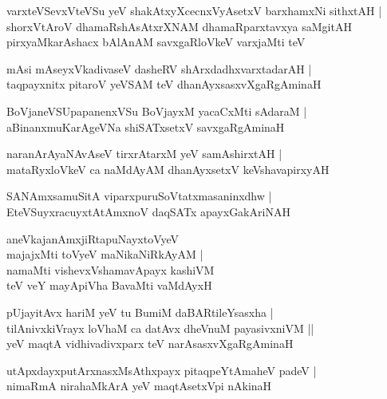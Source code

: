\documentclass[twoside,12pt,openright]{book}
\newcounter{shloka}[chapter]
\begin{document}
\begin{shloka}%
varxteVSevxVteVSu yeV shakAtxyXcecnxVyAsetxV barxhamxNi sithxtAH |\\
shorxVtAroV dhamaRshAsAtxrXNAM dhamaRparxtavxya saMgitAH \\
pirxyaMkarAshacx bAlAnAM savxgaRloVkeV varxjaMti teV 
\end{shloka}

\begin{shloka}%
mAsi mAseyxVkadivaseV dasheRV shArxdadhxvarxtadarAH |\\
taqpayxnitx  pitaroV yeVSAM teV dhanAyxsasxvXgaRgAminaH 
\end{shloka}

\begin{shloka}%
BoVjaneVSUpapanenxVSu BoVjayxM yacaCxMti sAdaraM |\\
aBinanxmuKarAgeVNa shiSATxsetxV savxgaRgAminaH 
\end{shloka}

\begin{shloka}%
naranArAyaNAvAseV tirxrAtarxM yeV samAshirxtAH |\\
mataRyxloVkeV ca naMdAyAM dhanAyxsetxV keVshavapirxyAH 
\end{shloka}

\begin{shloka}%
SANAmxsamuSitA viparxpuruSoVtatxmasaninxdhw |\\
EteVSuyxracuyxtAtAmxnoV daqSATx apayxGakAriNAH 
\end{shloka}

\begin{shloka}%
aneVkajanAmxjiRtapuNayxtoVyeV \\
majajxMti toVyeV maNikaNiRkAyAM |\\
namaMti vishevxVshamavApayx kashiVM \\
teV veY mayApiVha BavaMti vaMdAyxH 
\end{shloka}

\begin{shloka}%
pUjayitAvx hariM yeV tu BumiM daBARtileYsasxha |\\
tilAnivxkiVrayx loVhaM ca datAvx dheVnuM payasivxniVM ||\\
yeV maqtA vidhivadivxparx teV narAsasxvXgaRgAminaH 
\end{shloka}

\begin{shloka}%
utApxdayxputArxnasxMsAthxpayx pitaqpeYtAmaheV padeV |\\
nimaRmA nirahaMkArA yeV maqtAsetxVpi nAkinaH
\end{shloka}
\end{document}
